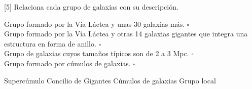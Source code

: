 [5] Relaciona cada grupo de galaxias con su descripción.

\begin{multicols}{2}
    \begin{flushright}
        Grupo formado por la Vía Láctea y unas 30 galaxias más.                                                     $\square$\\ \vspace{0.5cm}
        Grupo formado por la Vía Láctea y otras 14 galaxias gigantes que integra una estructura en forma de anillo. $\square$\\ \vspace{0.5cm}
        Grupo de galaxias cuyos tamaños típicos son de 2 a 3 Mpc.                                                   $\square$\\ \vspace{0.5cm}
        Grupo formado por cúmulos de galaxias.                                                                      $\square$\\ \vspace{0.5cm}
    \end{flushright}
    \vspace{1cm}
    \begin{checkboxes}
        \choice Supercúmulo          \vspace{0.8cm}
        \choice Concilio de Gigantes \vspace{0.8cm}
        \choice Cúmulos de galaxias  \vspace{0.8cm}
        \choice Grupo local          \vspace{0.8cm}
    \end{checkboxes}
\end{multicols}